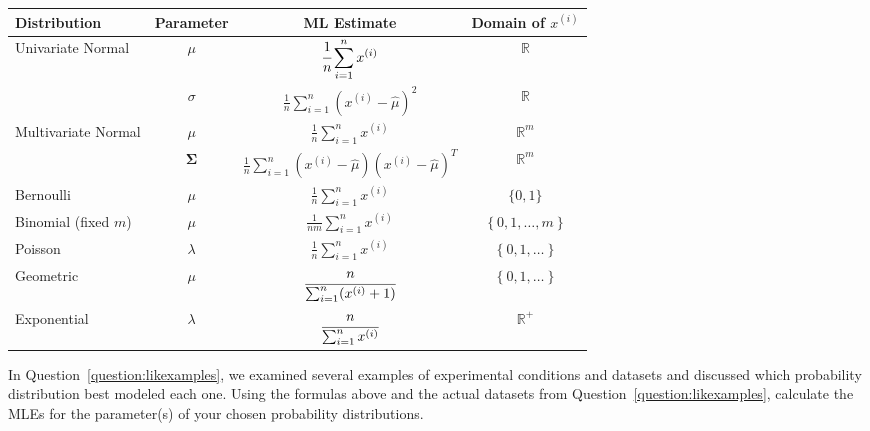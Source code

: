 \begin{center} {\small
\begin{tabular}{lccc}
\toprule
Distribution & Parameter & ML Estimate & Domain of $x^{(i)}$ \\
\midrule
Univariate Normal & $\mu$ & $\displaystyle \cfrac{1}{n} \sum_{i=1}^n x^{(i)}$  & $\mathbb{R}$ \\
& $\sigma$ & $\displaystyle \frac{1}{n} \sum_{i=1}^n \left(x^{(i)} - \hat{\mu}\right)^2 $ & $\mathbb{R}$ \\
Multivariate Normal & $\mu$ & $\displaystyle \frac{1}{n} \sum_{i=1}^n x^{(i)}$ & $\mathbb{R}^m$ \\
& $\boldsymbol\Sigma$ & $\displaystyle \frac{1}{n} \sum_{i=1}^n (x^{(i)}-\hat{\mu})(x^{(i)}-\hat{\mu})^T$ & $\mathbb{R}^m$ \\
Bernoulli & $\mu$ & $\displaystyle \frac{1}{n} \sum_{i=1}^n x^{(i)}$ & $\{0, 1\}$ \\
Binomial (fixed $m$) & $\mu$ & $\displaystyle \frac{1}{nm} \sum_{i=1}^n x^{(i)}$ & $\left\{ 0, 1, \dots, m \right\}$ \\
Poisson & $\lambda$ & $\displaystyle \frac{1}{n} \sum_{i=1}^n x^{(i)}$ & $\left\{ 0, 1, \dots \right\}$\\
Geometric & $\mu$ & $\displaystyle \cfrac{n}{\sum_{i=1}^n (x^{(i)} + 1)} $ & $\left\{ 0, 1, \dots \right\}$ \\
Exponential & $\lambda$ & $\displaystyle \cfrac{n}{\sum_{i=1}^n x^{(i)}} $ & $\mathbb{R}^+$ \\
\bottomrule
\end{tabular}}
\end{center}

\begin{question}{}
In Question~\ref{question:likexamples}, we examined several examples of experimental conditions and datasets and discussed which probability distribution best modeled each one. Using the formulas above and the actual datasets from Question~\ref{question:likexamples}, calculate the MLEs for the parameter(s) of your chosen probability distributions. 
\end{question}
